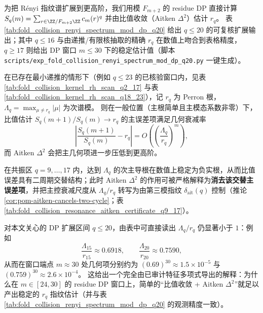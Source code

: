 

\begin{remark}[扩展指纹（可复核）：\texorpdfstring{$q\le 20$}{q<=20} 的 \texorpdfstring{$r_q$}{rq} 与 \texorpdfstring{$h_q$}{hq}]\label{rem:pom-renyi-spectrum-q20}
为把 Rényi 指纹谱扩展到更高阶，我们用模 \(F_{m+2}\) 的 residue DP 直接计算
\(
S_q(m)=\sum_{r\in\ZZ/F_{m+2}\ZZ}c_m(r)^q
\)
并由比值收敛（Aitken \(\Delta^2\)）估计 \(r_q\)。
表 \ref{tab:fold_collision_renyi_spectrum_mod_dp_q20} 给出 \(q\le 20\) 的可复核扩展输出；其中 \(q\le 16\) 与由递推/有限核抽取的精确 \(r_q\) 在数值上吻合到表格精度，\(q\ge 17\) 则给出 DP 窗口 \(m\le 30\) 下的稳定估计值（脚本 \texttt{scripts/exp\_fold\_collision\_renyi\_spectrum\_mod\_dp\_q20.py} 一键生成）。
\end{remark}

\begin{remark}\label{rem:pom-dp-window-spectral-gap}
在已存在最小递推的情形下（例如 \(q\le 23\) 的已核验窗口内，见表 \ref{tab:fold_collision_kernel_rh_scan_q2_17} 与表 \ref{tab:fold_collision_kernel_rh_scan_q18_23}），记 \(r_q\) 为 Perron 根，\(\Lambda_q=\max_{\mu\ne r_q}|\mu|\) 为次谱模。
则在一般位置（主根简单且主模态系数非零）下，比值估计 \(S_q(m+1)/S_q(m)\to r_q\) 的主误差项满足几何衰减率
\[
\left|\frac{S_q(m+1)}{S_q(m)}-r_q\right|=O\!\left(\left(\frac{\Lambda_q}{r_q}\right)^{m}\right),
\]
而 Aitken \(\Delta^2\) 会把主几何项进一步压低到更高阶。
\par
在共振区 \(q=9,\dots,17\) 内，达到 \(\Lambda_q\) 的次主导根在数值上稳定为负实根，从而比值误差具有二周期交替结构；此时 Aitken \(\Delta^2\) 的作用可被严格解释为\textbf{消去该交替主误差项}，并把主控衰减尺度从 \(\Lambda_q/r_q\) 转写为由第三模指纹 \(\delta_{\mathrm{ait}}(q)\) 控制（推论 \ref{cor:pom-aitken-cancels-two-cycle}；表 \ref{tab:fold_collision_resonance_aitken_certificate_q9_17}）。
\par
对本文关心的 DP 扩展区间 \(q\le 20\)，由表中可直接读出 \(\Lambda_q/r_q\) 仍显著小于 \(1\)：例如
\[
\frac{\Lambda_{15}}{r_{15}}\approx 0.6918,\qquad
\frac{\Lambda_{20}}{r_{20}}\approx 0.7590,
\]
从而在窗口端点 \(m\approx 30\) 处几何项分别约为 \((0.69)^{30}\approx 1.5\times 10^{-5}\) 与 \((0.759)^{30}\approx 2.6\times 10^{-4}\)。
这给出一个完全由已审计特征多项式导出的解释：为什么在 \(m\in[24,30]\) 的 residue DP 窗口上，简单的“比值收敛 + Aitken \(\Delta^2\)”就足以产出稳定的 \(r_q\) 指纹估计（并与表 \ref{tab:fold_collision_renyi_spectrum_mod_dp_q20} 的观测精度一致）。
\end{remark}


